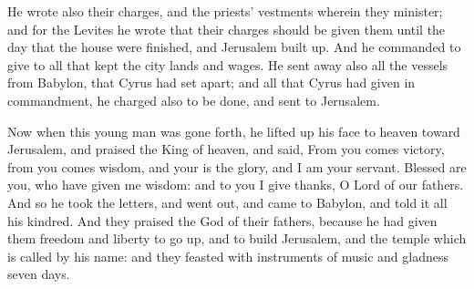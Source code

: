 {He wrote also
{} their charges, and the priests’ vestments wherein they minister;
and for the Levites he wrote that their charges should be given them until the day that the house were finished, and Jerusalem built up.
And he commanded to give to all that kept the city lands and wages.
He sent away also all the vessels from Babylon, that Cyrus had set apart; and all that Cyrus had given in commandment, he charged also to be done, and sent to Jerusalem.
\par }{\PP {}Now when this young man was gone forth, he lifted up his face to heaven toward Jerusalem, and praised the King of heaven,
and said, From you comes victory, from you comes wisdom, and your is the glory, and I am your servant.
Blessed are you, who have given me wisdom: and to you I give thanks, O Lord of our fathers.
And so he took the letters, and went out, and came to Babylon, and told it all his kindred.
And they praised the God of their fathers, because he had given them freedom and liberty
to go up, and to build Jerusalem, and the temple which is called by his name: and they feasted with instruments of music and gladness seven days.

}

